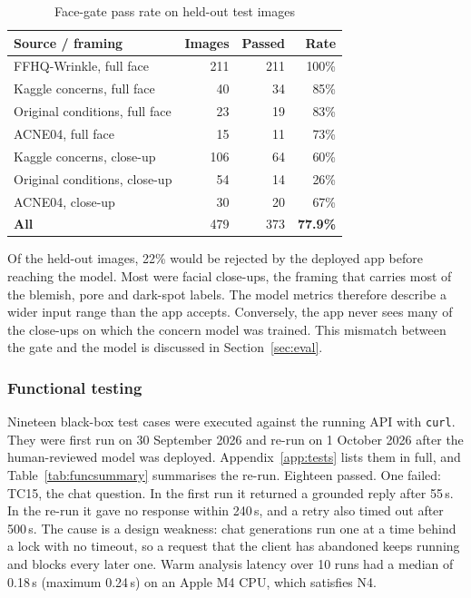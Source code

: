 \begin{table}[ht]
\centering\small
\caption{Face-gate pass rate on held-out test images}
\label{tab:gate}
\begin{tabular}{lrrr}
\toprule
\textbf{Source / framing} & \textbf{Images} & \textbf{Passed} & \textbf{Rate}\\
\midrule
FFHQ-Wrinkle, full face & 211 & 211 & 100\%\\
Kaggle concerns, full face & 40 & 34 & 85\%\\
Original conditions, full face & 23 & 19 & 83\%\\
ACNE04, full face & 15 & 11 & 73\%\\
Kaggle concerns, close-up & 106 & 64 & 60\%\\
Original conditions, close-up & 54 & 14 & 26\%\\
ACNE04, close-up & 30 & 20 & 67\%\\
\midrule
\textbf{All} & 479 & 373 & \textbf{77.9\%}\\
\bottomrule
\end{tabular}
\end{table}

Of the held-out images, 22\% would be rejected by the deployed app before reaching the model. Most were facial close-ups, the framing that carries most of the blemish, pore and dark-spot labels. The model metrics therefore describe a wider input range than the app accepts. Conversely, the app never sees many of the close-ups on which the concern model was trained. This mismatch between the gate and the model is discussed in Section~\ref{sec:eval}.

\subsubsection*{Functional testing}

Nineteen black-box test cases were executed against the running API with \texttt{curl}. They were first run on 30 September 2026 and re-run on 1 October 2026 after the human-reviewed model was deployed. Appendix~\ref{app:tests} lists them in full, and Table~\ref{tab:funcsummary} summarises the re-run. Eighteen passed. One failed: TC15, the chat question. In the first run it returned a grounded reply after 55\,s. In the re-run it gave no response within 240\,s, and a retry also timed out after 500\,s. The cause is a design weakness: chat generations run one at a time behind a lock with no timeout, so a request that the client has abandoned keeps running and blocks every later one. Warm analysis latency over 10 runs had a median of 0.18\,s (maximum 0.24\,s) on an Apple M4 CPU, which satisfies N4.


